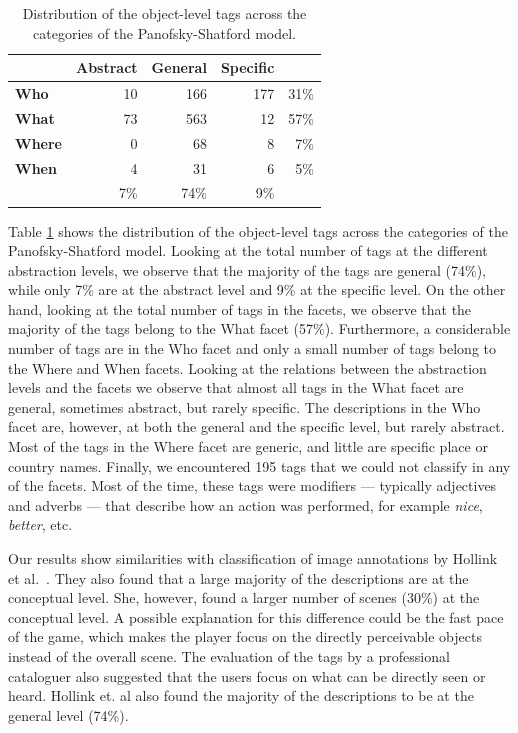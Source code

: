 \begin{table}
\begin{footnotesize}
\begin{tabular*}{\columnwidth}{@{\extracolsep{\fill}}lrrrr}
\toprule
\T \B & \textbf{Abstract} & \textbf{General} & \textbf{Specific}  \\
\midrule
\textbf{Who} \T \B & 10 & 166 &  177  & 31\%\\
\textbf{What} \B & 73 & 563 & 12 & 57\% \\
\textbf{Where} \B & 0 & 68 & 8& 7\%\\
\textbf{When} \B & 4 & 31 & 6 & 5\% \\
 \T & 7\% & 74\% & 9\% & \\
\bottomrule
\end{tabular*}
\end{footnotesize}
\label{object_tags}
\caption{Distribution of the object-level tags across the categories of the Panofsky-Shatford model.}
\end{table}


Table \ref{object_tags} shows the distribution of the object-level tags across
the categories of the Panofsky-Shatford model. Looking at the total number of
tags at the different abstraction levels, we observe that the majority of the
tags are general (74\%), while only 7\% are at the abstract level and 9\% at
the specific level. On the other hand, looking at the total number of tags in
the facets, we observe that the majority of the tags belong to the What facet
(57\%). Furthermore, a considerable number of tags are in the Who facet and
only a small number of tags belong to the Where and When facets. Looking at
the relations between the abstraction levels and the facets we observe that
almost all tags in the What facet are general, sometimes abstract, but rarely
specific. The descriptions in the Who facet are, however, at both the general
and the specific level, but rarely abstract. Most of the tags in the Where
facet are generic, and little are specific place or country names. Finally, we
encountered 195 tags that we could not classify in any of the facets. Most of
the time, these tags were modifiers --- typically adjectives and adverbs ---
that describe how an action was performed, for example \textit{nice}, \textit{better}, etc.

Our results show similarities with classification of image annotations by
Hollink et al.~\cite{laurapaper}. They also found that a large majority of the
descriptions are at the conceptual level. She, however, found a larger number
of scenes (30\%) at the conceptual level. A possible explanation for this
difference could be the fast pace of the game, which makes the player focus on
the directly perceivable objects instead of the overall scene. The evaluation
of the tags by a professional cataloguer also suggested that the users focus
on what can be directly seen or heard. Hollink et. al also found the majority of the descriptions to be at the general level (74\%).

